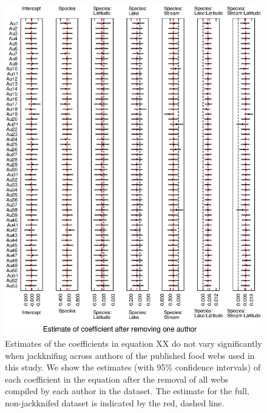 \documentclass[12pt]{article}
\begin{document}
    \begin{figure}[h]
    \centerline{\includegraphics*[width=.8\textwidth]{Figures/Jackknife/Gen_author.eps}}
    \caption{Estimates of the coefficients in equation XX do not vary significantly
    when jackknifing across authors of the published food webs used in this study. 
    We show the estimates (with 95\% confidence intervals) of each coefficient
    in the equation after the removal of all webs compiled by each author in the dataset.
    The estimate for the full, non-jackknifed dataset is indicated by the red, dashed line.}
    \label{Gen_web}
    \end{figure}
\end{document}
